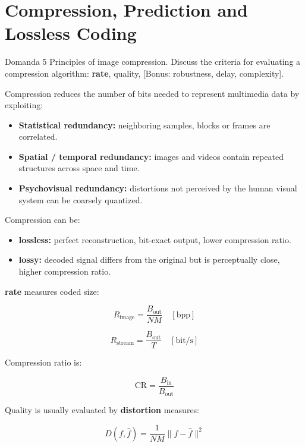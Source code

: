 \section{Compression, Prediction and Lossless Coding}




\begin{questionbox}{Domanda 5}
Principles of image compression. Discuss the criteria for evaluating a compression algorithm: \textbf{rate}, quality, [Bonus: robustness, delay, complexity].
\end{questionbox}


Compression reduces the number of bits needed to represent multimedia data by exploiting:

\begin{itemize}
  \item \textbf{Statistical redundancy:} neighboring samples, blocks or frames are correlated.
  \item \textbf{Spatial / temporal redundancy:} images and videos contain repeated structures across space and time.
  \item \textbf{Psychovisual redundancy:} distortions not perceived by the human visual system can be coarsely quantized.
\end{itemize}

Compression can be:

\begin{itemize}
  \item \textbf{\textbf{lossless}:} perfect reconstruction, bit-exact output, lower compression ratio.
  \item \textbf{\textbf{lossy}:} decoded signal differs from the original but is perceptually close, higher compression ratio.
\end{itemize}

\textbf{rate} measures coded size:


$$
R_{\text{image}} = \frac{B_{\text{out}}}{NM} \quad [\text{bpp}]
$$



$$
R_{\text{stream}} = \frac{B_{\text{out}}}{T} \quad [\text{bit/s}]
$$


Compression ratio is:


$$
\text{CR} = \frac{B_{\text{in}}}{B_{\text{out}}}
$$


Quality is usually evaluated by \textbf{distortion} measures:


$$
D(f,\hat{f}) = \frac{1}{NM}\|f-\hat{f}\|^2
$$



